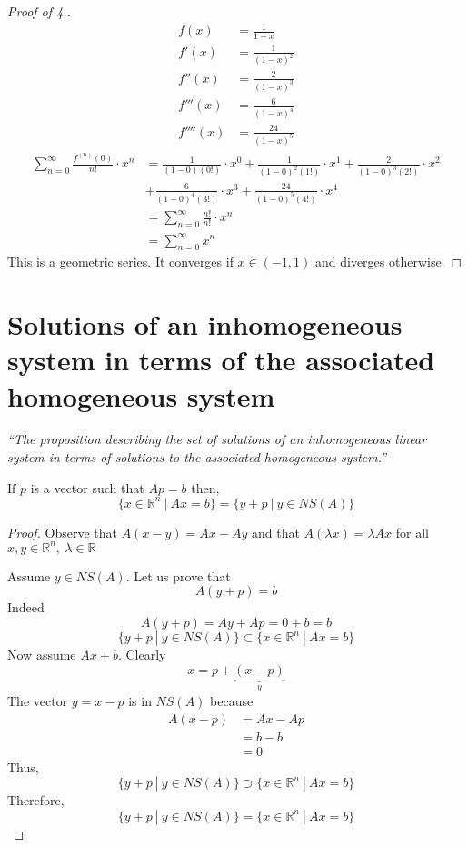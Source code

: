 \documentclass[12pt]{report}
\begin{document}
    \label{Maclaurin series 4}
    \begin{proof}[Proof of \textnormal{4.}]
        \begin{align*}
            f(x) &= \frac{1}{1-x}\\
            f'(x) &= \frac{1}{(1-x)^2}\\
            f''(x) &= \frac{2}{(1-x)^3}\\
            f'''(x) &= \frac{6}{(1-x)^4}\\
            f''''(x) &= \frac{24}{(1-x)^5}
        \end{align*}
        \begin{align*}
            \sum^\infty_{n=0} \frac{f^{(n)}(0)}{n!} \cdot x^n &= \frac{1}{(1-0)(0!)} \cdot x^0 + \frac{1}{(1-0)^2(1!)} \cdot x^1 + \frac{2}{(1-0)^3(2!)} \cdot x^2\\
            &+ \frac{6}{(1-0)^4(3!)} \cdot x^3 + \frac{24}{(1-0)^5(4!)} \cdot x^4\\
            &= \sum^\infty_{n=0} \frac{n!}{n!} \cdot x^n\\
            &= \sum^\infty_{n=0} x^n
        \end{align*}
        This is a geometric series. It converges if \(x \in (-1,1)\) and diverges otherwise.
    \end{proof}
    \setcounter{section}{26}
    \section{Solutions of an inhomogeneous system in terms of the associated homogeneous system}
    \textit{``The proposition describing the set of solutions of an inhomogeneous linear system in terms of solutions to the associated homogeneous system.''} \vspace{3mm}
    \begin{theorem}
        If \(p\) is a vector such that \(Ap = b\) then,
        \[\{x \in \mathbb{R}^n ~|~ Ax = b\} = \{y+p ~|~ y \in NS(A)\}\]
    \end{theorem}
    \begin{proof}
        Observe  that \(A(x-y) = Ax - Ay\) and that \(A(\lambda x) = \lambda Ax\) for all \(x,y \in \mathbb{R}^n, ~ \lambda \in \mathbb{R}\)

        Assume \(y \in NS(A)\). Let us prove that 
        \[A(y+p)= b\]
        Indeed
        \[A(y+p) = Ay + Ap = 0+ b =b\]
        \[\{y+p ~|~ y \in NS(A)\} \subset \{x \in \mathbb{R}^n ~|~ Ax = b\}\]
        Now assume \(Ax + b\). Clearly
        \[x = p + \underbrace{(x-p)}_y\]
        The vector \(y = x-p\) is in \(NS(A)\) because 
        \begin{align*}
            A(x-p) &= Ax -Ap\\
            &= b-b\\
            &= 0
        \end{align*}
        Thus,
        \[\{y+p ~|~ y \in NS(A)\} \supset  \{x \in \mathbb{R}^n ~|~ Ax = b\}\]
        Therefore,
        \[\{y+p ~|~ y \in NS(A)\} = \{x \in \mathbb{R}^n ~|~ Ax = b\}\]
    \end{proof}
\end{document}
